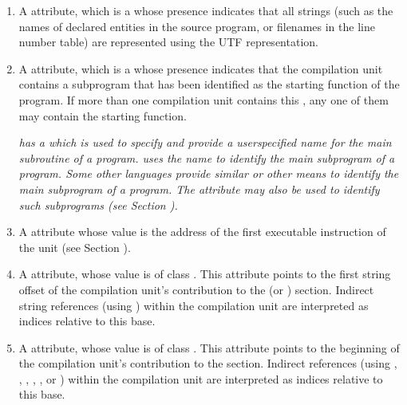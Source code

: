 \begin{enumerate}[1. ]
\item A \DWATuseUTFeightDEFN{} attribute,
which is a  whose
presence indicates that all strings (such as the names of
declared entities in the source program, or filenames in the line number table) 
are represented using the UTF representation. 

\item A \DWATmainsubprogramDEFN{} attribute, which is a 
whose presence indicates 
\hypertarget{chap:DWATmainsubprogramunitcontainingmainorstartingsubprogram}{}
that the compilation unit contains a
subprogram that has been identified as the starting function
of the program. If more than one compilation unit contains
this , any one of them may contain the starting function.

\textit{ has a 
which is used
to specify and provide a user\dash specified name for the main
subroutine of a program. 
 uses the name  to identify
the main subprogram of a program. Some other languages provide
similar or other means to identify the main subprogram of
a program. The \DWATmainsubprogram{} attribute may also be used to
identify such subprograms (see 
Section ).}

\item A \DWATentrypc{} attribute whose value is the address of the first
\hypertarget{chap:DWATentrypcofcompileunit}{}
\hypertarget{chap:DWATentrypcofpartialunit}{}
executable instruction of the unit (see 
Section ).

\item A \DWATstroffsetsbaseDEFN{}
\hypertarget{chap:DWATstroffsetbaseforindirectstringtable}{} 
attribute, whose value is of class \CLASSstroffsetsptr. 
This attribute points to the first string
offset of the compilation unit's contribution to the
\dotdebugstroffsets{} (or \dotdebugstroffsetsdwo{}) section. 
Indirect string references
(using \DWFORMstrx) within the compilation unit are
interpreted as indices relative to this base.

\item A \DWATaddrbaseDEFN{}
\hypertarget{chap:DWATaddrbaseforaddresstable}{}
attribute, whose value is of class \CLASSaddrptr.
This attribute points to the beginning of the compilation
unit's contribution to the \dotdebugaddr{} section.
Indirect references (using \DWFORMaddrx, \DWOPaddrx, 
\DWOPconstx, \DWLLEbaseaddressselectionentry{}, 
\DWLLEstartendentry, or \DWLLEstartlengthentry) within the compilation unit are
interpreted as indices relative to this base.


\end{enumerate}
